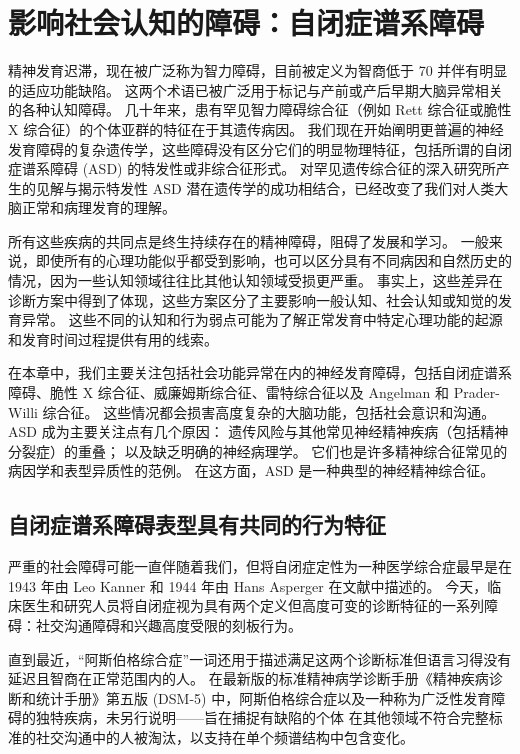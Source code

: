 \chapter{影响社会认知的障碍：自闭症谱系障碍} \label{chap:chap62}

精神发育迟滞，现在被广泛称为智力障碍，目前被定义为智商低于 70 并伴有明显的适应功能缺陷。 这两个术语已被广泛用于标记与产前或产后早期大脑异常相关的各种认知障碍。 几十年来，患有罕见智力障碍综合征（例如 Rett 综合征或脆性 X 综合征）的个体亚群的特征在于其遗传病因。 我们现在开始阐明更普遍的神经发育障碍的复杂遗传学，这些障碍没有区分它们的明显物理特征，包括所谓的自闭症谱系障碍 (ASD) 的特发性或非综合征形式。 对罕见遗传综合征的深入研究所产生的见解与揭示特发性 ASD 潜在遗传学的成功相结合，已经改变了我们对人类大脑正常和病理发育的理解。

所有这些疾病的共同点是终生持续存在的精神障碍，阻碍了发展和学习。 一般来说，即使所有的心理功能似乎都受到影响，也可以区分具有不同病因和自然历史的情况，因为一些认知领域往往比其他认知领域受损更严重。 事实上，这些差异在诊断方案中得到了体现，这些方案区分了主要影响一般认知、社会认知或知觉的发育异常。 这些不同的认知和行为弱点可能为了解正常发育中特定心理功能的起源和发育时间过程提供有用的线索。

在本章中，我们主要关注包括社会功能异常在内的神经发育障碍，包括自闭症谱系障碍、脆性 X 综合征、威廉姆斯综合征、雷特综合征以及 Angelman 和 Prader-Willi 综合征。 这些情况都会损害高度复杂的大脑功能，包括社会意识和沟通。 ASD 成为主要关注点有几个原因： 遗传风险与其他常见神经精神疾病（包括精神分裂症）的重叠； 以及缺乏明确的神经病理学。 它们也是许多精神综合征常见的病因学和表型异质性的范例。 在这方面，ASD 是一种典型的神经精神综合征。

\section{自闭症谱系障碍表型具有共同的行为特征}

严重的社会障碍可能一直伴随着我们，但将自闭症定性为一种医学综合症最早是在 1943 年由 Leo Kanner 和 1944 年由 Hans Asperger 在文献中描述的。 今天，临床医生和研究人员将自闭症视为具有两个定义但高度可变的诊断特征的一系列障碍：社交沟通障碍和兴趣高度受限的刻板行为。

直到最近，“阿斯伯格综合症”一词还用于描述满足这两个诊断标准但语言习得没有延迟且智商在正常范围内的人。 在最新版的标准精神病学诊断手册《精神疾病诊断和统计手册》第五版 (DSM-5) 中，阿斯伯格综合症以及一种称为广泛性发育障碍的独特疾病，未另行说明——旨在捕捉有缺陷的个体 在其他领域不符合完整标准的社交沟通中的人被淘汰，以支持在单个频谱结构中包含变化。

